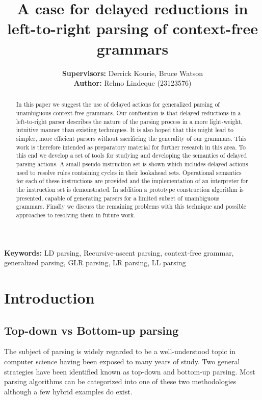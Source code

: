 \documentclass[a4paper,11pt]{article}
\begin{document}
\title{A case for delayed reductions in left-to-right parsing of context-free grammars}
\author{\textbf{Supervisors:} Derrick Kourie, Bruce Watson\\
\textbf{Author:} Rehno Lindeque (23123576)\\
}

\maketitle

\begin{abstract}
In this paper we suggest the use of delayed actions for generalized parsing of unambiguous context-free grammars. 
Our conftention is that delayed reductions in a left-to-right parser describes the nature of the parsing process in a more light-weight, intuitive manner than existing techniques.
It is also hoped that this might lead to simpler, more efficient parsers without sacrificing the generality of our grammars.
This work is therefore intended as preparatory material for further research in this area.
To this end we develop a set of tools for studying and developing the semantics of delayed parsing actions.
A small pseudo instruction set is shown which includes delayed actions used to resolve rules containing cycles in their lookahead sets.
Operational semantics for each of these instructions are provided and the implementation of an interpreter for the instruction set is demonstrated.
In addition a prototype construction algorithm is presented, capable of generating parsers for a limited subset of unambiguous grammars.
Finally we discuss the remaining problems with this technique and possible approaches to resolving them in future work.\\
\end{abstract}

\textbf{Keywords:} LD parsing, Recursive-ascent parsing, context-free grammar, generalized parsing, GLR parsing, LR parsing, LL parsing

\section{Introduction}

\subsection{Top-down vs Bottom-up parsing}

The subject of parsing is widely regarded to be a well-understood topic in computer science having been exposed to many years of study.
Two general strategies have been identified known as top-down and bottom-up parsing. 
Most parsing algorithms can be categorized into one of these two methodologies although a few hybrid examples do exist.\\
\end{document}
